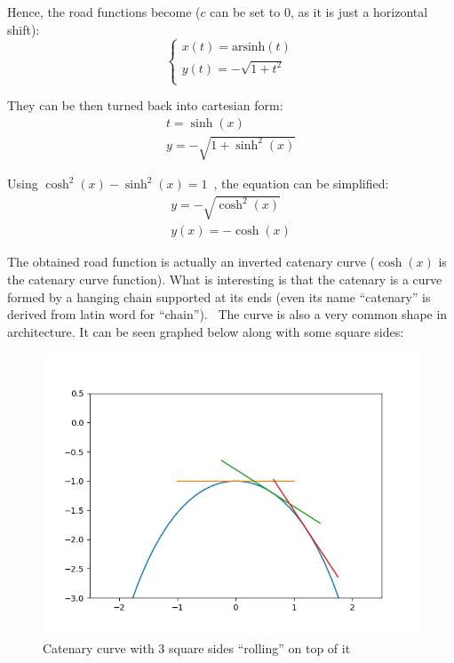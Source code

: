 \documentclass[12pt]{article}
\begin{document}
        Hence, the road functions become ($c$ can be set to 0, as it is just a horizontal shift):
        \begin{equation}\label{eq:road_2}
            \begin{cases}
                x(t) = \text{arsinh}(t) \\
                y(t) = -\sqrt{1+t^2} \\
            \end{cases}
        \end{equation}

        They can be then turned back into cartesian form:
        \begin{align}
            t = \sinh(x) \\
            y = -\sqrt{1+\sinh^2(x)}
        \end{align}

        Using $\cosh^2(x) - \sinh^2(x) = 1$~\cite{oxford_dict}, the equation can be simplified:
        \begin{align}
            y = -\sqrt{\cosh^2(x)} \\
            y(x) = -\cosh(x)
        \end{align}

        The obtained road function is actually an inverted catenary curve ($\cosh(x)$ is the catenary curve function). What is interesting is that the catenary is a curve formed by a hanging chain supported at its ends (even its name ``catenary'' is derived from latin word for ``chain'').~\cite{mathworld_catenary} The curve is also a very common shape in architecture. It can be seen graphed below along with some square sides:
        
        \begin{figure}[H]
            \centering
            \includegraphics[width=0.75\linewidth]{images/cosh_many.png}
            \caption[Catenary curve with 3 square sides]{Catenary curve with 3 square sides ``rolling'' on top of it\footnotemark}\label{fig:cosh}
        \end{figure}
\end{document}
